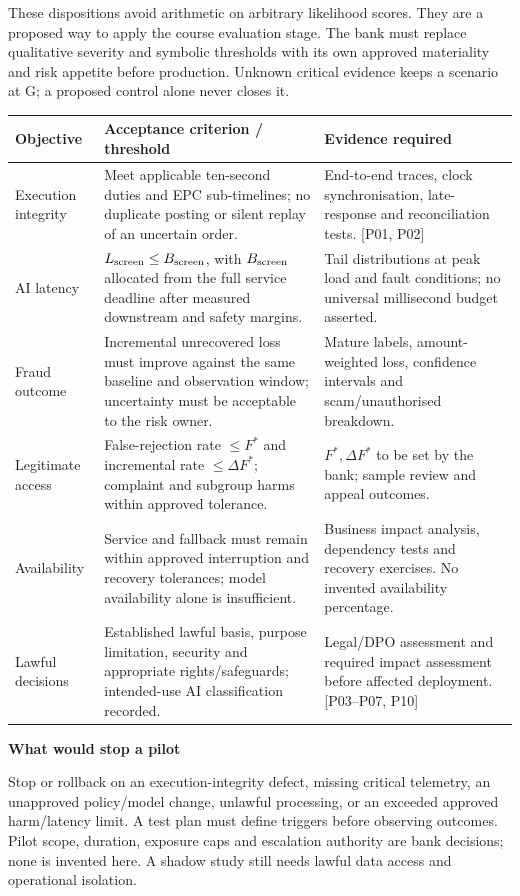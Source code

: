 \documentclass[11pt,a4paper]{article}
\newcommand{\sub}[1]{\par\vspace{2mm}\textbf{\color{ink}#1}\par}
\newcommand{\src}[1]{{\small[#1]}}
\begin{document}
These dispositions avoid arithmetic on arbitrary likelihood scores. They are a proposed way to apply the course evaluation stage. The bank must replace qualitative severity and symbolic thresholds with its own approved materiality and risk appetite before production. Unknown critical evidence keeps a scenario at G; a proposed control alone never closes it.
\par{\small\begin{tabularx}{\textwidth}{@{}P{27mm}YP{44mm}@{}}\toprule
Objective & Acceptance criterion / threshold & Evidence required\\\midrule
Execution integrity & Meet applicable ten-second duties and EPC sub-timelines; no duplicate posting or silent replay of an uncertain order. & End-to-end traces, clock synchronisation, late-response and reconciliation tests. \src{P01, P02}\\
AI latency & $L_{\rm screen} \leq B_{\rm screen}$, with $B_{\rm screen}$ allocated from the full service deadline after measured downstream and safety margins. & Tail distributions at peak load and fault conditions; no universal millisecond budget asserted.\\
Fraud outcome & Incremental unrecovered loss must improve against the same baseline and observation window; uncertainty must be acceptable to the risk owner. & Mature labels, amount-weighted loss, confidence intervals and scam/unauthorised breakdown.\\
Legitimate access & False-rejection rate $\leq F^*$ and incremental rate $\leq\Delta F^*$; complaint and subgroup harms within approved tolerance. & $F^*,\Delta F^*$ to be set by the bank; sample review and appeal outcomes.\\
Availability & Service and fallback must remain within approved interruption and recovery tolerances; model availability alone is insufficient. & Business impact analysis, dependency tests and recovery exercises. No invented availability percentage.\\
Lawful decisions & Established lawful basis, purpose limitation, security and appropriate rights/safeguards; intended-use AI classification recorded. & Legal/DPO assessment and required impact assessment before affected deployment. \src{P03--P07, P10}\\\bottomrule
\end{tabularx}\par}
\sub{What would stop a pilot}
Stop or rollback on an execution-integrity defect, missing critical telemetry, an unapproved policy/model change, unlawful processing, or an exceeded approved harm/latency limit. A test plan must define triggers before observing outcomes. Pilot scope, duration, exposure caps and escalation authority are bank decisions; none is invented here. A shadow study still needs lawful data access and operational isolation.
\end{document}
